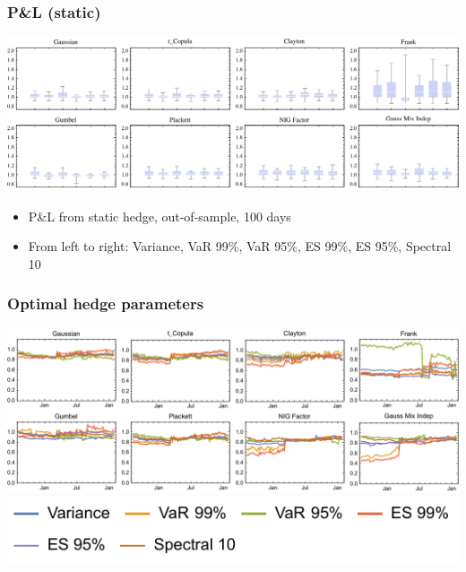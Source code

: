 \documentclass[10pt,mathserif,notes=show]{beamer}
\renewcommand{\(}{\begin{columns}}
\renewcommand{\)}{\end{columns}}
\newcommand{\<}[1]{\begin{column}{#1}}
\renewcommand{\>}{\end{column}}
\theoremstyle{definition}
\begin{document}
\begin{frame}
  \frametitle{P\&L (static)}
  \hspace*{-0.75cm}\includegraphics[scale=0.65]{../_pics/PL_static_out.pdf}
  \begin{itemize}
  \item P\&L from static hedge, out-of-sample, 100 days
  \item From left to right: Variance, VaR 99\%, VaR 95\%, ES 99\%, ES
    95\%, Spectral 10
  \end{itemize}
\end{frame}

\begin{frame}
  \frametitle{Optimal hedge parameters}
  \hspace*{-.75cm}\includegraphics[scale=.65]{../_pics/hParams.pdf}\\
  \includegraphics[scale=.85]{../_pics/hParams_Legend.pdf}
\end{frame}

\end{document}
